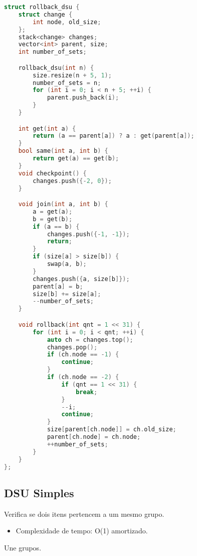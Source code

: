 \documentclass[11pt, a4paper, oneside]{book}
\begin{document}
\begin{multicols}{2}
\begin{lstlisting}[language=C++]
struct rollback_dsu {
    struct change {
        int node, old_size;
    };
    stack<change> changes;
    vector<int> parent, size;
    int number_of_sets;

    rollback_dsu(int n) {
        size.resize(n + 5, 1);
        number_of_sets = n;
        for (int i = 0; i < n + 5; ++i) {
            parent.push_back(i);
        }
    }

    int get(int a) {
        return (a == parent[a]) ? a : get(parent[a]);
    }
    bool same(int a, int b) {
        return get(a) == get(b);
    }
    void checkpoint() {
        changes.push({-2, 0});
    }

    void join(int a, int b) {
        a = get(a);
        b = get(b);
        if (a == b) {
            changes.push({-1, -1});
            return;
        }
        if (size[a] > size[b]) {
            swap(a, b);
        }
        changes.push({a, size[b]});
        parent[a] = b;
        size[b] += size[a];
        --number_of_sets;
    }

    void rollback(int qnt = 1 << 31) {
        for (int i = 0; i < qnt; ++i) {
            auto ch = changes.top();
            changes.pop();
            if (ch.node == -1) {
                continue;
            }
            if (ch.node == -2) {
                if (qnt == 1 << 31) {
                    break;
                }
                --i;
                continue;
            }
            size[parent[ch.node]] = ch.old_size;
            parent[ch.node] = ch.node;
            ++number_of_sets;
        }
    }
};
\end{lstlisting}
\end{multicols}

\hfill

\subsection{DSU Simples}


Verifica se dois itens pertencem a um mesmo grupo.



\begin{itemize}
\item Complexidade de tempo: O(1) amortizado.
\end{itemize}



Une grupos.
\end{document}
